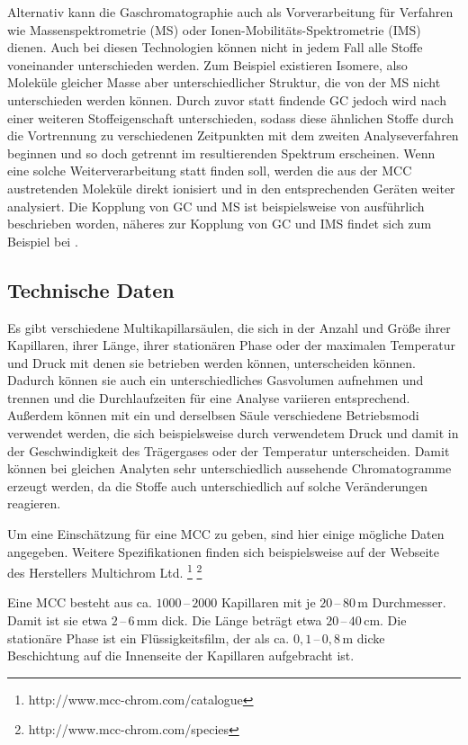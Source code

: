 Alternativ kann die Gaschromatographie auch als Vorverarbeitung für Verfahren wie Massenspektrometrie (MS) oder Ionen-Mobilitäts-Spektrometrie (IMS) dienen. Auch bei diesen Technologien können nicht in jedem Fall alle Stoffe voneinander unterschieden werden. Zum Beispiel existieren Isomere, also Moleküle gleicher Masse aber unterschiedlicher Struktur, die von der MS nicht unterschieden werden können. Durch zuvor statt findende GC jedoch wird nach einer weiteren Stoffeigenschaft unterschieden, sodass diese ähnlichen Stoffe durch die Vortrennung zu verschiedenen Zeitpunkten mit dem zweiten Analyseverfahren beginnen und so doch getrennt im resultierenden Spektrum erscheinen. Wenn eine solche Weiterverarbeitung statt finden soll, werden die aus der MCC austretenden Moleküle direkt ionisiert und in den entsprechenden Geräten weiter analysiert.
Die Kopplung von GC und MS ist beispielsweise von \cite{Hubschmann2009} ausführlich beschrieben worden, näheres zur Kopplung von GC und IMS findet sich zum Beispiel bei \citep{Baumbach2009}. 


\subsection{Technische Daten}

Es gibt verschiedene Multikapillarsäulen, die sich in der Anzahl und Größe ihrer Kapillaren, ihrer Länge, ihrer stationären Phase oder der maximalen Temperatur und Druck mit denen sie betrieben werden können, unterscheiden können. Dadurch können sie auch ein unterschiedliches Gasvolumen aufnehmen und trennen und die Durchlaufzeiten für eine Analyse variieren entsprechend. Außerdem können mit ein und derselbsen Säule verschiedene Betriebsmodi verwendet werden, die sich beispielsweise durch verwendetem Druck und damit in der Geschwindigkeit des Trägergases oder der Temperatur unterscheiden. Damit können bei gleichen Analyten sehr unterschiedlich aussehende Chromatogramme erzeugt werden, da die Stoffe auch unterschiedlich auf solche Veränderungen reagieren.

Um eine Einschätzung für eine MCC zu geben, sind hier einige mögliche Daten angegeben. Weitere Spezifikationen finden sich beispielsweise auf der Webseite des Herstellers Multichrom Ltd. \footnote[1]{http://www.mcc-chrom.com/catalogue} \footnote[2]{http://www.mcc-chrom.com/species} 


Eine MCC besteht aus ca. $1000\,$--$\,2000$ Kapillaren mit je $20\,$--$\,80$\,\textmu m Durchmesser. Damit ist sie etwa $2\,$--$\,6$\,mm dick. Die Länge beträgt etwa  $20\,$--$\,40 $\,cm. Die stationäre Phase ist ein Flüssigkeitsfilm, der als ca. $0,1\,$--$\,0,8$\,\textmu m dicke Beschichtung auf die Innenseite der Kapillaren aufgebracht ist. 

